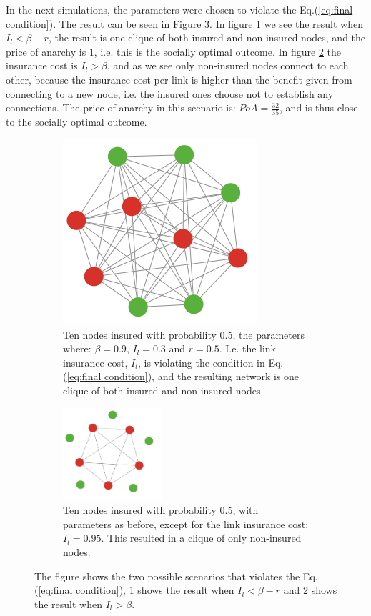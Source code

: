 In the next simulations, the parameters were chosen to violate the Eq.(\ref{eq:final condition}). The result can be seen in Figure \ref{fig:SimulationViolating}.  In figure \ref{fig:SimulationViolating:a} we see the result when $I_{l}<\beta-r$, the result is one clique of both insured and non-insured nodes, and the price of anarchy is $1$, i.e. this is the socially optimal outcome. In figure \ref{fig:SimulationViolating:b} the insurance cost is $I_{l}>\beta$, and as we see only non-insured nodes connect to each other, because the insurance cost per link is higher than the benefit given from connecting to a new node, i.e. the insured ones choose not to establish any connections. The price of anarchy in this scenario is: $PoA=\frac{32}{35}$, and is thus close to the socially optimal outcome.
\begin{figure}[h]
\centering
\begin{subfigure}{.5\textwidth}
  \centering
\includegraphics[width=0.4\linewidth]{../Figures/FirstSimulationViolatingResult.png}

\caption{\label{fig:SimulationViolating:a} Ten nodes insured with probability 0.5, the parameters where: $\beta=0.9$, $I_{l}=0.3$ and $r=0.5$. I.e. the link insurance cost, $I_{l}$, is violating the condition in Eq.(\ref{eq:final condition}), and the resulting network is one clique of both insured and non-insured nodes.}
\end{subfigure}
\quad
\begin{subfigure}{0.46\textwidth}
\centering
\includegraphics[width=0.4\textwidth]{../Figures/SimulationViolating2.png}

\caption{\label{fig:SimulationViolating:b} Ten nodes insured with probability 0.5, with parameters as before, except for the link insurance cost:$I_{l}=0.95$. This resulted in a clique of only non-insured nodes. }
\end{subfigure}
\caption{\label{fig:SimulationViolating} The figure shows the two possible scenarios that violates the Eq.(\ref{eq:final condition}), \ref{fig:SimulationViolating:a} shows the result when $I_{l}<\beta-r$ and \ref{fig:SimulationViolating:b} shows the result when $I_{l}>\beta$.}
\end{figure}


